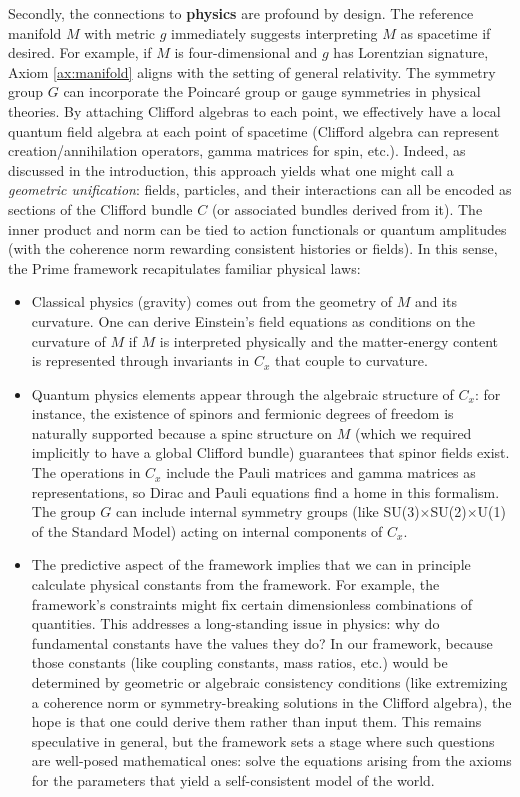 \documentclass[11pt]{article}
\begin{document}
Secondly, the connections to \textbf{physics} are profound by design. The reference manifold $M$ with metric $g$ immediately suggests interpreting $M$ as spacetime if desired. For example, if $M$ is four-dimensional and $g$ has Lorentzian signature, Axiom \ref{ax:manifold} aligns with the setting of general relativity. The symmetry group $G$ can incorporate the Poincaré group or gauge symmetries in physical theories. By attaching Clifford algebras to each point, we effectively have a local quantum field algebra at each point of spacetime (Clifford algebra can represent creation/annihilation operators, gamma matrices for spin, etc.). Indeed, as discussed in the introduction, this approach yields what one might call a \emph{geometric unification}: fields, particles, and their interactions can all be encoded as sections of the Clifford bundle $C$ (or associated bundles derived from it). The inner product and norm can be tied to action functionals or quantum amplitudes (with the coherence norm rewarding consistent histories or fields). In this sense, the Prime framework recapitulates familiar physical laws:
\begin{itemize}
    \item Classical physics (gravity) comes out from the geometry of $M$ and its curvature. One can derive Einstein's field equations as conditions on the curvature of $M$ if $M$ is interpreted physically and the matter-energy content is represented through invariants in $C_x$ that couple to curvature.
    \item Quantum physics elements appear through the algebraic structure of $C_x$: for instance, the existence of spinors and fermionic degrees of freedom is naturally supported because a spinc structure on $M$ (which we required implicitly to have a global Clifford bundle) guarantees that spinor fields exist. The operations in $C_x$ include the Pauli matrices and gamma matrices as representations, so Dirac and Pauli equations find a home in this formalism. The group $G$ can include internal symmetry groups (like SU(3)$\times$SU(2)$\times$U(1) of the Standard Model) acting on internal components of $C_x$.
    \item The predictive aspect of the framework implies that we can in principle calculate physical constants from the framework. For example, the framework's constraints might fix certain dimensionless combinations of quantities. This addresses a long-standing issue in physics: why do fundamental constants have the values they do? In our framework, because those constants (like coupling constants, mass ratios, etc.) would be determined by geometric or algebraic consistency conditions (like extremizing a coherence norm or symmetry-breaking solutions in the Clifford algebra), the hope is that one could derive them rather than input them. This remains speculative in general, but the framework sets a stage where such questions are well-posed mathematical ones: solve the equations arising from the axioms for the parameters that yield a self-consistent model of the world.
\end{itemize}
\end{document}
